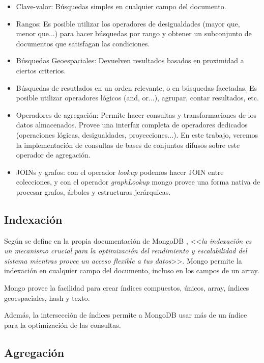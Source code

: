 \begin{itemize}
    \item Clave-valor: Búsquedas simples en cualquier campo del documento.
    \item Rangos: Es posible utilizar los operadores de desigualdades (mayor que, menor que...) para hacer búsquedas por rango y obtener un subconjunto de documentos que satisfagan las condiciones.
    \item Búsquedas Geoespaciales: Devuelven resultados basados en proximidad a ciertos criterios.
    \item Búsquedas de resutlados en un orden relevante, o en búsquedas facetadas. Es posible utilizar operadores lógicos (and, or...), agrupar, contar resultados, etc.
    \item Operadores de agregación: Permite hacer consultas y transformaciones de los datos almacenados. Provee una interfaz completa de operadores dedicados (operaciones lógicas, desigualdades, proyecciones...). En este trabajo, veremos la implementación de consultas de bases de conjuntos difusos sobre este operador de agregación.
    \item JOINs y grafos: con el operador \textit{lookup} podemos hacer JOIN entre colecciones, y con el operador \textit{graphLookup} mongo provee una forma nativa de procesar grafos, árboles y estructuras jerárquicas.
\end{itemize}


\subsection{Indexación}

Según se define en la propia documentación de MongoDB \cite{mongodb}, <<\textit{la indexación es un mecanismo crucial para la optimización del rendimiento y escalabilidad del sistema mientras provee un acceso flexible a tus datos}>>. Mongo permite la indexación en cualquier campo del documento, incluso en los campos de un array.

Mongo provee la facilidad para crear índices compuestos, únicos, array, índices geoespaciales, hash y texto.

Además, la intersección de índices permite a MongoDB usar más de un índice para la optimización de las consultas.

\subsection{Agregación}

